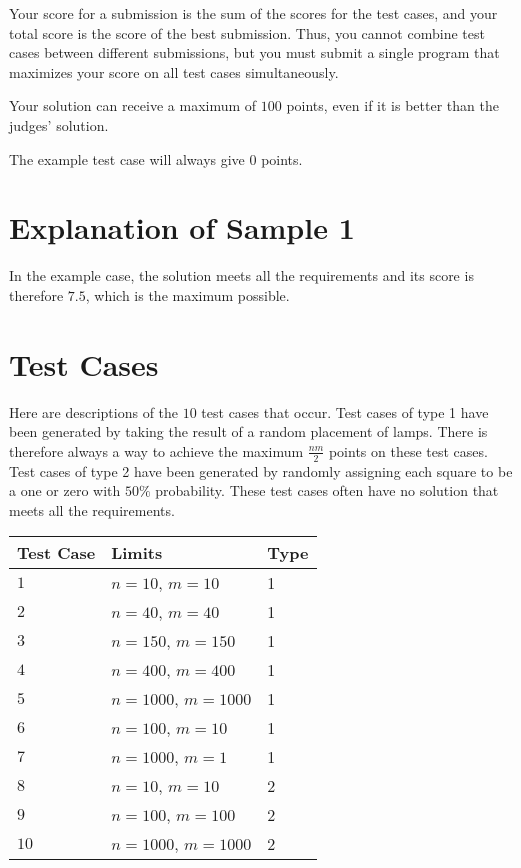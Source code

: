 Your score for a submission is the sum of the scores for the test cases, and your total score is the score of the best submission.
Thus, you cannot combine test cases between different submissions, but you must submit a single program that maximizes your score on all test cases simultaneously.

Your solution can receive a maximum of $100$ points, even if it is better than the judges' solution.

The example test case will always give $0$ points.


\section*{Explanation of Sample 1}
In the example case, the solution meets all the requirements and its score is therefore $7.5$, which is the maximum possible.

\section*{Test Cases}
Here are descriptions of the $10$ test cases that occur.
Test cases of type 1 have been generated by taking the result of a random placement of lamps.
There is therefore always a way to achieve the maximum $\frac{nm}{2}$ points on these test cases.
Test cases of type 2 have been generated by randomly assigning each square to be a one or zero with $50\%$ probability. These test cases often have no solution that meets all the requirements.

\noindent
\begin{tabular}{| l | l | l |}
\hline
\textbf{Test Case} & \textbf{Limits}                  & \textbf{Type}  \\ \hline
$1$       & $n = 10$, $m = 10$                        & 1  \\ \hline
$2$       & $n = 40$, $m = 40$                        & 1   \\ \hline
$3$       & $n = 150$, $m = 150$                      & 1   \\ \hline
$4$       & $n = 400$, $m = 400$                      & 1  \\ \hline
$5$       & $n = 1000$, $m = 1000$                    & 1   \\ \hline
$6$       & $n = 100$, $m = 10$                       & 1   \\ \hline
$7$       & $n = 1000$, $m = 1$                       & 1   \\ \hline
$8$       & $n = 10$, $m = 10$                        & 2  \\ \hline
$9$       & $n = 100$, $m = 100$                      & 2   \\ \hline
$10$      & $n = 1000$, $m = 1000$                    & 2   \\ \hline
\end{tabular}
